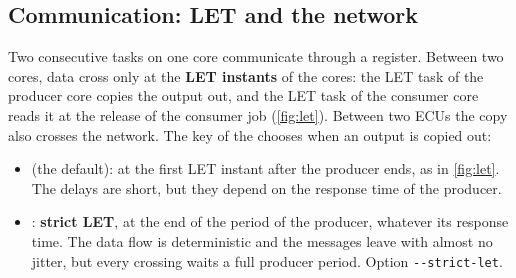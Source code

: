\subsection{Communication: LET and the network}
\label{sec:concepts-let}

Two consecutive tasks on one core communicate through a register. Between
two cores, data cross only at the \textbf{LET instants} of the cores: the
LET task of the producer core copies the output out, and the LET task of
the consumer core reads it at the release of the consumer job
(\cref{fig:let}). Between two ECUs the copy also crosses the network. The
key  of the  chooses when an
output is copied out:
\begin{itemize}
\item {} (the default): at the first LET instant after the
producer ends, as in \cref{fig:let}. The delays are short, but they depend
on the response time of the producer.
\item {}: \textbf{strict LET}, at the end
of the period of the producer, whatever its response time. The data flow
is deterministic and the messages leave with almost no jitter, but every
crossing waits a full producer period. Option \texttt{-{}-strict-let}.
\end{itemize}

